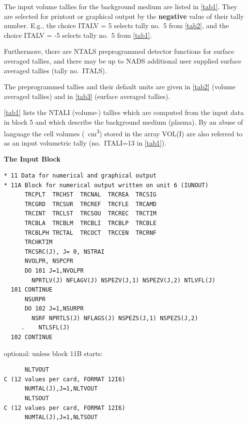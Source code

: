 The input volume tallies for the background medium are listed in \cref{tab1}.
They are selected for printout or graphical output by the \textbf{negative}
value of their tally number.
E.g., the choice ITALV = 5 selects tally no.\ 5 from \cref{tab2}, and the
choice ITALV = -5 selects tally no.\ 5 from \cref{tab1}.

Furthermore, there are NTALS  preprogrammed detector functions for surface
averaged tallies, and there may be up to NADS additional user supplied surface
averaged tallies (tally no.\ ITALS).

The preprogrammed tallies and their default units are given in \cref{tab2}
(volume averaged tallies) and in \cref{tab3} (surface averaged tallies).

\cref{tab1} lists the NTALI  (volume-) tallies which are
computed from the input data in block 5 and which describe the
background medium (plasma).
By an abuse of language the cell volumes (\si{\per\cubic\centi\metre}) stored
in the array VOL(I) are also referred to as an input volumetric tally (no.\
ITALI=13 in \cref{tab1}).

\medskip

\textbf{The Input Block} 

\medskip 

\begin{lstlisting}
* 11 Data for numerical and graphical output
* 11A Block for numerical output written on unit 6 (IUNOUT)
      TRCPLT  TRCHST  TRCNAL  TRCREA  TRCSIG
      TRCGRD  TRCSUR  TRCREF  TRCFLE  TRCAMD
      TRCINT  TRCLST  TRCSOU  TRCREC  TRCTIM
      TRCBLA  TRCBLM  TRCBLI  TRCBLP  TRCBLE
      TRCBLPH TRCTAL  TRCOCT  TRCCEN  TRCRNF
      TRCHKTIM
      TRCSRC(J), J= 0, NSTRAI
      NVOLPR, NSPCPR
      DO 101 J=1,NVOLPR
        NPRTLV(J) NFLAGV(J) NSPEZV(J,1) NSPEZV(J,2) NTLVFL(J)
  101 CONTINUE
      NSURPR
      DO 102 J=1,NSURPR
        NSRF NPRTLS(J) NFLAGS(J) NSPEZS(J,1) NSPEZS(J,2)
     .    NTLSFL(J)
  102 CONTINUE
\end{lstlisting} 

optional: unless block 11B starts:

\begin{lstlisting}
      NLTVOUT
C (12 values per card, FORMAT 12I6)
      NUMTAL(J),J=1,NLTVOUT
      NLTSOUT
C (12 values per card, FORMAT 12I6)
      NUMTAL(J),J=1,NLTSOUT
\end{lstlisting}

